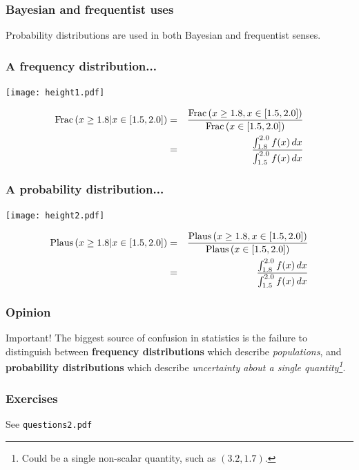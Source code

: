\documentclass{beamer}
\begin{document}
\begin{frame}[t, fragile]
\frametitle{Bayesian and frequentist uses}

Probability distributions are used in both Bayesian and frequentist senses.

\end{frame}



\begin{frame}
\frametitle{A frequency distribution...}

\centering
\texttt{[image: height1.pdf]}

\begin{eqnarray*}
\textnormal{Frac}\left(x \geq 1.8 | x \in [1.5, 2.0]\right)
&=& 
\frac{\textnormal{Frac}\left(x \geq 1.8, x \in [1.5, 2.0]\right)}
{\textnormal{Frac}\left(x \in [1.5, 2.0]\right)}\\
&=& \frac{\int_{1.8}^{2.0} f(x) \, dx}{\int_{1.5}^{2.0} f(x) \, dx}
\end{eqnarray*}

\end{frame}


\begin{frame}
\frametitle{A probability distribution...}

\centering
\texttt{[image: height2.pdf]}

\begin{eqnarray*}
\textnormal{Plaus}\left(x \geq 1.8 | x \in [1.5, 2.0]\right)
&=& 
\frac{\textnormal{Plaus}\left(x \geq 1.8, x \in [1.5, 2.0]\right)}
{\textnormal{Plaus}\left(x \in [1.5, 2.0]\right)}\\
&=& \frac{\int_{1.8}^{2.0} f(x) \, dx}{\int_{1.5}^{2.0} f(x) \, dx}
\end{eqnarray*}

\end{frame}


\begin{frame}
\frametitle{Opinion}

\begin{alertblock}{Important!}
The biggest source of confusion in statistics is the failure to
distinguish between {\bf frequency distributions} which describe
{\em populations}, and {\bf probability distributions} which describe
{\em uncertainty about a single quantity\footnote{Could be a single
non-scalar quantity, such as $(3.2, 1.7)$.}}.
\end{alertblock}

\end{frame}

\begin{frame}
\frametitle{Exercises}

\vspace{3em}
\begin{center}
See {\tt questions2.pdf}
\end{center}

\end{frame}
\end{document}
